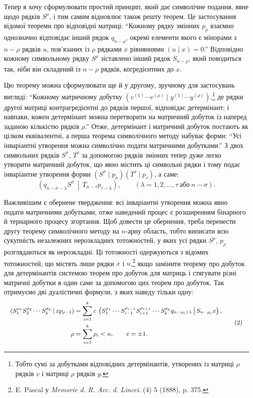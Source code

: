 \documentclass[11pt]{article}
\newcommand{\eps}{\varepsilon}
\newcommand{\pair}[2]{\left(#1\,\middle|\,#2\right)}
\begin{document}
Тепер я хочу сформулювати простий принцип, який дає символічне подання, явне щодо рядків $S^\rho$, і тим самим відновлює також решту теорем. Це застосування відомої теореми про відповідні матриці: ``Кожному рядку змінних $p_\rho$ взаємно однозначно відповідає інший рядок $q_{n-\rho}$, окремі елементи якого є мінорами з $n-\rho$ рядків $u$, пов'язаних із $\rho$ рядками $x$ рівняннями $(u\mid x)=0$.'' Відповідно кожному символьному рядку $S^\rho$ зіставлено інший рядок $S_{n-\rho}$, який поводиться так, ніби він складений із $n-\rho$ рядків, когредієнтних до $x$.

Цю теорему можна сформулювати ще й у другому, зручному для застосувань вигляді: ``Кожному матричному добутку $(v^{(1)}\cdots v^{(\rho)}\mid y^{(1)}\cdots y^{(\rho)})$,\footnote{Тобто сумі за добутками відповідних детермінантів, утворених із матриці $\rho$ рядків $v$ і матриці $\rho$ рядків $y$.} де рядки другої матриці контрагредієнтні до рядків першої, відповідає детермінант; і навпаки, кожен детермінант можна перетворити на матричний добуток із наперед заданою кількістю рядків $\rho$.'' Отже, детермінант і матричний добуток постають як цілком еквівалентні, а перша теорема символічного методу набуває форми: ``Усі інваріантні утворення можна символічно подати матричними добутками.'' З двох символьних рядків $S^\sigma$, $T^\tau$ за допомогою рядків змінних тепер дуже легко утворити матричний добуток, що явно містить ці символьні рядки і тому подає інваріантне утворення форми $(S^\sigma\mid p_\sigma)(T^\tau\mid p_\tau)$, а саме:
\begin{equation}
 \pair{q_{n-\sigma-\lambda}S^\sigma}{T_{n-\tau}p_{\tau-\lambda}},
 \qquad (\lambda=1,2,\ldots,\tau\ \text{або}\ n-\sigma).
\tag{1}
\end{equation}

Важливішим є обернене твердження: всі інваріантні утворення можна явно подати матричними добутками, отже наведений процес є розширенням бінарного й тернарного процесу згортання. Щоб довести це обернення, треба перенести другу теорему символічного методу на $n$-арну область, тобто виписати всю сукупність незалежних нерозкладних тотожностей, у яких усі рядки $S^\rho$, $p_\rho$ розглядаються як нерозкладні. Ці тотожності одержуються з відомих тотожностей, що містять лише рядки $x$ і $u$,\footnote{E. Pascal у \emph{Memorie d. R. Acc. d. Lincei}. (4) 5 (1888), p. 375.} якщо замінити теорему про добуток для детермінантів системою теорем про добуток для матриць і стягувати різні матричні добутки в один саме за допомогою цих теорем про добуток. Так отримуємо дві дуалістичні формули, з яких наведу тільки одну:
\begin{equation}
\small
\begin{aligned}
 \pair{S_1^{\rho_1}S_2^{\rho_2}\cdots S_k^{\rho_k}}{x p_{\rho-1}}
 &=\sum_{i=1}^{k}\eps\,\pair{S_1^{\rho_1}\cdots S_{i-1}^{\rho_{i-1}}S_{i+1}^{\rho_{i+1}}\cdots S_k^{\rho_k}q_{n-\rho_i+1}}{S_{n-\rho_i}x},\\
 \rho&=\sum_{i=1}^{k}\rho_i<n,\qquad \eps=\pm1.
\end{aligned}
\tag{2}
\end{equation}
\end{document}
